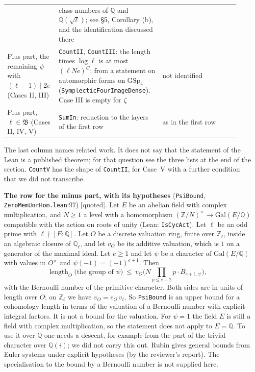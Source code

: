 \documentclass[11pt,letterpaper]{article}
\newcommand{\Z}{\mathbb Z}\newcommand{\Q}{\mathbb Q}\newcommand{\C}{\mathbb C}
\newcommand{\quoted}{\textsf{[quoted]}}
\begin{document}
\begin{center}
\begin{tabular}{@{}p{0.19\linewidth}p{0.43\linewidth}p{0.32\linewidth}@{}}
& \raggedright class numbers of $\Q$ and $\Q(\sqrt\ell)$; see \S5, Corollary (b), and the identification discussed there\tabularnewline
\raggedright Plus part, the remaining $\psi$ with $(\ell-1)\mid2e$ (Cases II, III)
& \raggedright \texttt{CountII}, \texttt{CountIII}: the length times $\log\ell$ is at most $(\ell Ne)^{C}$; from a statement on
automorphic forms on $\mathrm{GSp}_4$ (\texttt{SymplecticFourImageDense}). Case III is empty for $\zeta$
& \raggedright not identified\tabularnewline
\raggedright Plus part, $\ell\in\mathfrak B$ (Cases II, IV, V)
& \raggedright \texttt{SumIn}: reduction to the layers of the first row
& \raggedright as in the first row\tabularnewline
\bottomrule
\end{tabular}
\end{center}

The last column names related work. It does not say that the statement of the Lean is a published theorem;
for that question see the three lists at the end of the section. \texttt{CountV} has the shape of
\texttt{CountII}, for Case~V with a further condition that we did not transcribe.

\textbf{The row for the minus part, with its hypotheses} (\texttt{PsiBound},
\texttt{ZeroMemUnrHom.lean}:97) \quoted. Let $E$ be an abelian field with complex multiplication, and $N\ge1$
a level with a homomorphism $(\Z/N)^\times\to\mathrm{Gal}(E/\Q)$ compatible with the action on roots of unity
(Lean: \texttt{IsCycAct}). Let $\ell$ be an odd prime with $\ell\nmid[E:\Q]$. Let $O$ be a discrete valuation
ring, finite over $\Z_\ell$, inside an algebraic closure of $\Q_\ell$, and let $v_O$ be its additive
valuation, which is $1$ on a generator of the maximal ideal. Let $e\ge1$ and let $\psi$ be a character of
$\mathrm{Gal}(E/\Q)$ with values in $O^\times$ and $\psi(-1)=(-1)^{e+1}$. Then
\begin{equation}\label{D:338}
 \operatorname{length}_O\big(\text{the group of }\psi\big)\ \le\ v_O\Big(N\prod_{p\le e+2}p\cdot B_{e+1,\psi}\Big),
\end{equation}
with the Bernoulli number of the primitive character. Both sides are in units of length over $O$; on $\Z_\ell$
we have $v_O=e_O\,v_\ell$. So \texttt{PsiBound} is an upper bound for a cohomology length in terms of the
valuation of a Bernoulli number with explicit integral factors. It is not a bound for the valuation. For
$\psi=1$ the field $E$ is still a field with complex multiplication, so the statement does not apply to
$E=\Q$. To use it over $\Q$ one needs a descent, for example from the part of the trivial character over
$\Q(i)$; we did not carry this out. Rubin \cite[\S2.2]{Rub00} gives general bounds from Euler systems under
explicit hypotheses (by the reviewer's report). The specialisation to the bound by a Bernoulli number is not supplied here.
\end{document}
